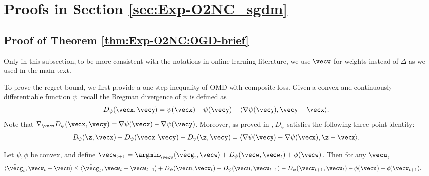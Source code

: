 \section{Proofs in Section \ref{sec:Exp-O2NC_sgdm}}
\label{app:Exp-O2NC:sgdm}

\subsection{Proof of Theorem \ref{thm:Exp-O2NC:OGD-brief}}

Only in this subsection, to be more consistent with the notations in online learning literature, we use $\vecw$ for weights instead of $\Delta$ as we used in the main text.

To prove the regret bound, we first provide a one-step inequality of OMD with composite loss. Given a convex and continuously differentiable function $\psi$, recall the Bregman divergence of $\psi$ is defined as
\begin{equation*}
    D_\psi(\vecx,\vecy) = \psi(\vecx) - \psi(\vecy) - \langle \nabla\psi(\vecy), \vecy-\vecx\rangle.
\end{equation*}
Note that $\nabla_\vecx D_\psi(\vecx,\vecy) = \nabla \psi(\vecx) - \nabla\psi(\vecy)$. Moreover, as proved in \cite{chen1993convergence}, $D_\psi$ satisfies the following three-point identity:
\begin{align*}
    D_\psi(\z,\vecx) + D_\psi(\vecx,\vecy) - D_\psi(\z,\vecy) = \langle \nabla\psi(\vecy) - \nabla\psi(\vecx), \z-\vecx\rangle.
\end{align*}

\begin{lemma}
\label{lem:Exp-O2NC:OMD-one-step}
Let $\psi, \phi$ be convex, and define $\vecw_{t+1} = \argmin_\vecw \langle \tilde\vecg_t,\vecw\rangle + D_\psi(\vecw,\vecw_t) + \phi(\vecw)$. Then for any $\vecu$,
\begin{align*}
    \langle \tilde\vecg_t, \vecw_t-\vecu\rangle 
    &\le \langle \tilde\vecg_t, \vecw_t-\vecw_{t+1}\rangle + D_\psi(\vecu,\vecw_t) - D_\psi(\vecu,\vecw_{t+1}) - D_\psi(\vecw_{t+1},\vecw_t) + \phi(\vecu) - \phi(\vecw_{t+1}).
\end{align*}
\end{lemma}

